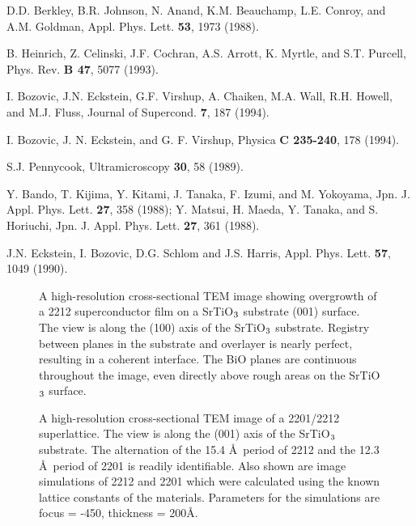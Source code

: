 \begin{references}
 D.D. Berkley, B.R. Johnson, N. Anand, K.M. Beauchamp,
L.E. Conroy, and A.M.  Goldman, Appl. Phys. Lett. {\bf 53}, 1973
(1988).

 B. Heinrich, Z. Celinski, J.F. Cochran,
A.S. Arrott, K. Myrtle, and S.T. Purcell, Phys.  Rev. {\bf B 47}, 5077
(1993).

 I. Bozovic, J.N. Eckstein, G.F. Virshup,
A. Chaiken, M.A. Wall, R.H. Howell, and M.J.  Fluss, Journal of
Supercond. {\bf 7}, 187 (1994).

 I. Bozovic, J. N. Eckstein, and G. F. Virshup,
Physica {\bf C 235-240}, 178 (1994).

 S.J. Pennycook, Ultramicroscopy {\bf 30}, 58
(1989).

 Y. Bando, T. Kijima, Y. Kitami, J. Tanaka, F. Izumi,
and M. Yokoyama, Jpn. J. Appl.  Phys. Lett. {\bf 27}, 358 (1988);
Y. Matsui, H. Maeda, Y. Tanaka, and S. Horiuchi, Jpn. J. Appl.
Phys. Lett. {\bf 27}, 361 (1988).

 J.N. Eckstein, I. Bozovic, D.G. Schlom and
J.S. Harris, Appl. Phys. Lett. {\bf 57}, 1049 (1990).

\end{references}

\clearpage

\begin{figure}
\caption{A high-resolution cross-sectional TEM image showing overgrowth
of a 2212 superconductor film on a SrTiO$\rm _3$ substrate (001) surface.
The view is along the (100) axis of the SrTiO$\rm _3$ substrate. Registry
between planes in the substrate and overlayer is nearly perfect,
resulting in a coherent interface.  The BiO planes are continuous
throughout the image, even directly above rough areas on the SrTiO$\rm _3$
surface.}
\label{overgrowth}
\end{figure}

\begin{figure}
\caption{A high-resolution cross-sectional TEM image of a 2201/2212
superlattice.  The view is along the (001) axis of the SrTiO$\rm _3$
substrate.  The alternation of the 15.4 \AA\ period of 2212 and the
12.3 \AA\ period of 2201 is readily identifiable.  Also shown are
image simulations of 2212 and 2201 which were calculated using the
known lattice constants of the materials.  Parameters for the
simulations are focus = -450, thickness = 200\AA.}
\label{superlattice}
\end{figure}


